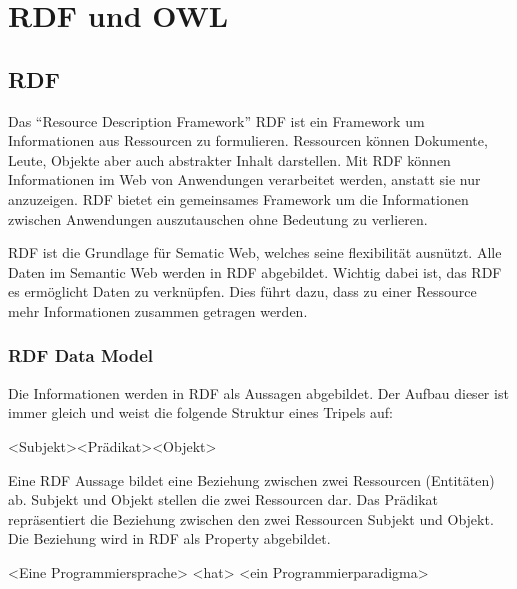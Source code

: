 \chapter{RDF und OWL}
\label{chap:owl_Rdf}

\section{RDF}
\label{sec:owlRdf_rdf}

Das "`Resource Description Framework"' RDF ist ein Framework um Informationen aus Ressourcen zu formulieren. Ressourcen können Dokumente, Leute, Objekte aber auch abstrakter Inhalt darstellen. Mit RDF können Informationen im Web von Anwendungen verarbeitet werden, anstatt sie nur anzuzeigen. RDF bietet ein gemeinsames Framework um die Informationen zwischen Anwendungen auszutauschen ohne Bedeutung zu verlieren. 

RDF ist die Grundlage für Sematic Web, welches seine flexibilität ausnützt. Alle Daten im Semantic Web werden in RDF abgebildet. Wichtig dabei ist, das RDF es ermöglicht Daten zu verknüpfen. Dies führt dazu, dass zu einer Ressource mehr Informationen zusammen getragen werden.

\subsection{RDF Data Model}
\label{sec:owlRdf_rdf_dataModel}
Die Informationen werden in RDF als Aussagen abgebildet. Der Aufbau dieser  ist immer gleich und weist die folgende Struktur eines Tripels auf:

\noindent\hspace*{15mm}<Subjekt><Prädikat><Objekt>

Eine RDF Aussage bildet eine Beziehung zwischen zwei Ressourcen (Entitäten) ab. 
Subjekt und Objekt stellen die zwei Ressourcen dar. Das Prädikat repräsentiert die Beziehung zwischen den zwei Ressourcen Subjekt und Objekt. Die Beziehung wird in RDF als Property abgebildet. 
 
\noindent\hspace*{15mm} <Eine Programmiersprache> <hat> <ein Programmierparadigma>


